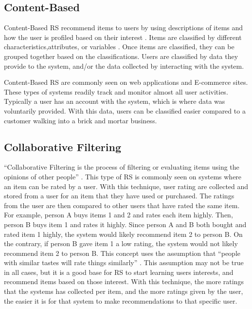 \documentclass[sigconf]{acmart}
\begin{document}
\subsection{Content-Based}
Content-Based RS recommend items to users by using descriptions of items and how the user is profiled based on
their interest \cite {Pazzani2007}. Items are classified by different characteristics,attributes, or variables
\cite{Pazzani2007}. Once items are classified, they can be grouped together based on the classifications. Users
are classified by data they provide to the system, and/or the data collected by interacting with the system. 

Content-Based RS are commonly seen on web applications and E-commerce sites. These types of systems readily
track and monitor almost all user activities. Typically a user has an account with the system, which is where
data was voluntarily provided. With this data, users can be classified easier compared to a customer walking
into a brick and mortar business.

\subsection{Collaborative Filtering}
``Collaborative Filtering is the process of filtering or evaluating items using the opinions of other people''
\cite{Schafer2007}. This type of RS is commonly seen on systems where an item can be rated by a user. With this
technique, user rating are collected and stored from a user for an item that they have used or purchased. The
ratings from the user are then compared to other users that have rated the same item. For example, person A
buys items 1 and 2 and rates each item highly. Then, person B buys item 1 and rates it highly. Since person A
and B both bought and rated item 1 highly, the system would likely recommend item 2 to person B. On the
contrary, if person B gave item 1 a low rating, the system would not likely recommend item 2 to person B. This
concept uses the assumption that ``people with similar tastes will rate things similarly'' \cite{Schafer2007}.
This assumption may not be true in all cases, but it is a good base for RS to start learning users interests,
and recommend items based on those interest. With this technique, the more ratings that the systems has
collected per item, and the more ratings given by the user, the easier it is for that system to make
recommendations to that specific user.
\end{document}
